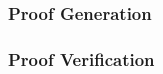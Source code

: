 \subsubsection{Proof Generation} \label{sec:pol-implementation:proof-generation}

\subsubsection{Proof Verification} \label{sec:pol-implementation:proof-verification}



